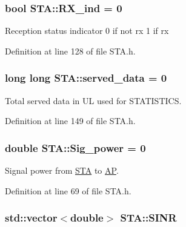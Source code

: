 \hypertarget{classSTA_aace6d664e5ecf495177277ef030141c6}{
\subsubsection[{R\-X\-\_\-ind}]{\setlength{\rightskip}{0pt plus 5cm}bool S\-T\-A\-::\-R\-X\-\_\-ind = 0}}\label{classSTA_aace6d664e5ecf495177277ef030141c6}
Reception status indicator 0 if not rx 1 if rx 

Definition at line 128 of file S\-T\-A.\-h.

\hypertarget{classSTA_ac25732c1d2f29de2f5cd3cfc65fcb559}{
\subsubsection[{served\-\_\-data}]{\setlength{\rightskip}{0pt plus 5cm}long long S\-T\-A\-::served\-\_\-data = 0}}\label{classSTA_ac25732c1d2f29de2f5cd3cfc65fcb559}


Total served data in U\-L used for S\-T\-A\-T\-I\-S\-T\-I\-C\-S. 



Definition at line 149 of file S\-T\-A.\-h.

\hypertarget{classSTA_aed9adbb07ca59c2efa1470e76180331c}{
\subsubsection[{Sig\-\_\-power}]{\setlength{\rightskip}{0pt plus 5cm}double S\-T\-A\-::\-Sig\-\_\-power = 0\hspace{0.3cm}{\ttfamily [private]}}}\label{classSTA_aed9adbb07ca59c2efa1470e76180331c}


Signal power from \hyperlink{classSTA}{S\-T\-A} to \hyperlink{classAP}{A\-P}. 



Definition at line 69 of file S\-T\-A.\-h.

\hypertarget{classSTA_a8d180b4c6fda9f084bea3d396e66532c}{
\subsubsection[{S\-I\-N\-R}]{\setlength{\rightskip}{0pt plus 5cm}std\-::vector$<$double$>$ S\-T\-A\-::\-S\-I\-N\-R}}\label{classSTA_a8d180b4c6fda9f084bea3d396e66532c}



